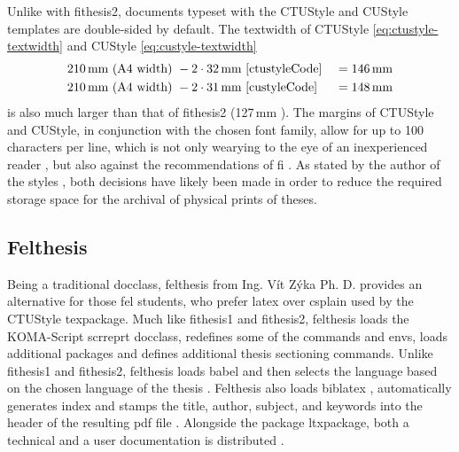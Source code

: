     Unlike with fithesis2, documents typeset with the CTUStyle and CUStyle templates are double-sided by default. The \gls{textwidth} of CTUStyle \eqref{eq:ctustyle-textwidth} and CUStyle \eqref{eq:custyle-textwidth}\begin{align}
      \label{eq:ctustyle-textwidth} 210\text{\,mm} \text{ (A4 width) } &- 2\cdot32\text{\,mm} \text{ \cite[line~249]{ctustyleCode} } &= 146\text{\,mm} \\
      \label{eq:custyle-textwidth}  210\text{\,mm} \text{ (A4 width) } &- 2\cdot31\text{\,mm} \text{ \cite[line~229]{custyleCode} } &= 148\text{\,mm}
    \end{align} is also much larger than that of fithesis2 (127\,mm \cite[lines~989, 1017, 1045]{fithesis2Code}). The margins of CTUStyle and CUStyle, in conjunction with the chosen font family, \label{overlong-lines} allow for up to 100 characters per line, which is not only wearying to the eye of an inexperienced reader \cite[section~2.1.2]{eletypostyle}, but also against the recommendations of \gls{fi} \cite[section~3.2.3]{bpdpfi}. As stated by the author of the styles \cite[post~25]{ctustyle-forums}, both decisions have likely been made in order to reduce the required storage space for the archival of physical prints of theses. 

    \subsection{Felthesis}\label{sec:felthesis}
    Being a traditional \gls{docclass}, felthesis from Ing. Vít Zýka Ph. D. provides an alternative for those \gls{fel} students, who prefer \gls{latex} over \gls{csplain} used by the CTUStyle \gls{texpackage}. Much like fithesis1 and fithesis2, felthesis loads the KOMA-Script scrreprt \gls{docclass}, redefines some of the commands and \glspl{env}, loads additional packages and defines additional thesis sectioning commands. Unlike fithesis1 and fithesis2, felthesis loads babel and then selects the language based on the chosen language of the thesis \cite[lines~687--691]{felthesisCode} . Felthesis also loads biblatex \pending{} \cite[line~722]{felthesisCode}, automatically generates index \pending{} \cite[line~763]{felthesisCode} and stamps the title, author, subject, and keywords into the header of the resulting \gls{pdf} file \cite[lines~959--971]{felthesisCode} \label{pdf-stamping}  . Alongside the package \gls{ltxpackage}, both a technical \cite{felthesisCode} and a user documentation \cite{felthesis} is distributed \pending{}.

